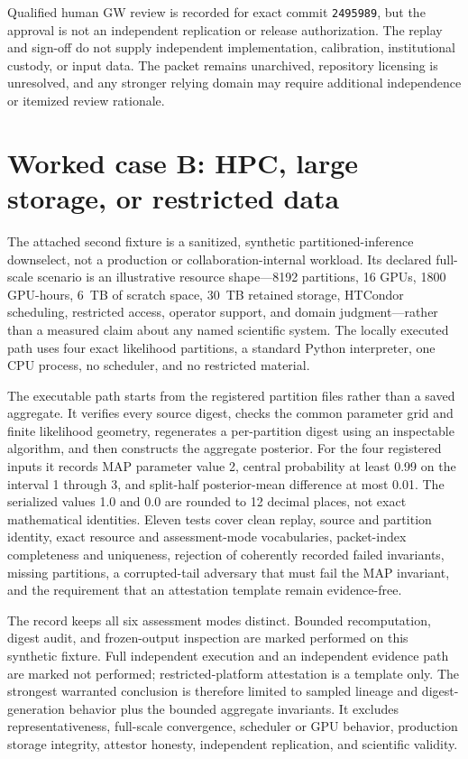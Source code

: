 \documentclass[11pt]{article}
\begin{document}
\begin{evidencegate}
Qualified human GW review is recorded for exact commit \texttt{2495989}, but the approval is not an independent replication or release authorization. The replay and sign-off do not supply independent implementation, calibration, institutional custody, or input data. The packet remains unarchived, repository licensing is unresolved, and any stronger relying domain may require additional independence or itemized review rationale.
\end{evidencegate}

\section{Worked case B: HPC, large storage, or restricted data}
\label{sec:hpc}

The attached second fixture is a sanitized, synthetic partitioned-inference downselect, not a production or collaboration-internal workload. Its declared full-scale scenario is an illustrative resource shape---8192 partitions, 16 GPUs, 1800 GPU-hours, 6~TB of scratch space, 30~TB retained storage, HTCondor scheduling, restricted access, operator support, and domain judgment---rather than a measured claim about any named scientific system. The locally executed path uses four exact likelihood partitions, a standard Python interpreter, one CPU process, no scheduler, and no restricted material.

The executable path starts from the registered partition files rather than a saved aggregate. It verifies every source digest, checks the common parameter grid and finite likelihood geometry, regenerates a per-partition digest using an inspectable algorithm, and then constructs the aggregate posterior. For the four registered inputs it records MAP parameter value 2, central probability at least 0.99 on the interval 1 through 3, and split-half posterior-mean difference at most 0.01. The serialized values 1.0 and 0.0 are rounded to 12 decimal places, not exact mathematical identities. Eleven tests cover clean replay, source and partition identity, exact resource and assessment-mode vocabularies, packet-index completeness and uniqueness, rejection of coherently recorded failed invariants, missing partitions, a corrupted-tail adversary that must fail the MAP invariant, and the requirement that an attestation template remain evidence-free.

The record keeps all six assessment modes distinct. Bounded recomputation, digest audit, and frozen-output inspection are marked performed on this synthetic fixture. Full independent execution and an independent evidence path are marked not performed; restricted-platform attestation is a template only. The strongest warranted conclusion is therefore limited to sampled lineage and digest-generation behavior plus the bounded aggregate invariants. It excludes representativeness, full-scale convergence, scheduler or GPU behavior, production storage integrity, attestor honesty, independent replication, and scientific validity.
\end{document}
